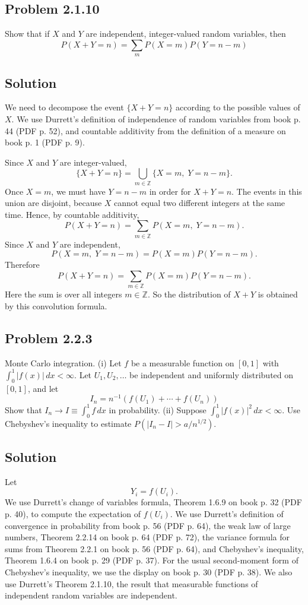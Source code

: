 \documentclass[a4paper,12pt,openany]{article}
\theoremstyle{plain}
\theoremstyle{definition}
\begin{document}
\subsection*{Problem 2.1.10}

Show that if $X$ and $Y$ are independent, integer-valued random variables, then
\[
P(X+Y=n) = \sum_m P(X=m)P(Y=n-m)
\]

\subsection*{Solution}

We need to decompose the event $\{X+Y=n\}$ according to the possible values of $X$. We use Durrett's definition of independence of random variables from book p. 44 (PDF p. 52), and countable additivity from the definition of a measure on book p. 1 (PDF p. 9).

\medskip

Since $X$ and $Y$ are integer-valued,
\[
\{X+Y=n\}
=
\bigcup_{m\in\mathbb{Z}}\{X=m,\;Y=n-m\}.
\]
Once $X=m$, we must have $Y=n-m$ in order for $X+Y=n$. The events in this union are disjoint, because $X$ cannot equal two different integers at the same time. Hence, by countable additivity,
\[
P(X+Y=n)
=
\sum_{m\in\mathbb{Z}}P(X=m,\;Y=n-m).
\]
Since $X$ and $Y$ are independent,
\[
P(X=m,\;Y=n-m)
=
P(X=m)P(Y=n-m).
\]
Therefore
\[
P(X+Y=n)
=
\sum_{m\in\mathbb{Z}}P(X=m)P(Y=n-m).
\]
Here the sum is over all integers $m\in\mathbb{Z}$.
So the distribution of $X+Y$ is obtained by this convolution formula.

\subsection*{Problem 2.2.3}

Monte Carlo integration. (i) Let $f$ be a measurable function on $[0, 1]$ with $\int_0^1 |f(x)|\,dx < \infty$. Let $U_1, U_2, \ldots$ be independent and uniformly distributed on $[0, 1]$, and let
\[
I_n = n^{-1}(f(U_1)+\cdots+f(U_n))
\]
Show that $I_n \to I \equiv \int_0^1 f\,dx$ in probability. (ii) Suppose $\int_0^1 |f(x)|^2\,dx < \infty$. Use Chebyshev’s inequality to estimate $P(|I_n - I| > a/n^{1/2})$.

\subsection*{Solution}

Let
\[
Y_i=f(U_i).
\]
We use Durrett's change of variables formula, Theorem 1.6.9 on book p. 32 (PDF p. 40), to compute the expectation of $f(U_i)$. We use Durrett's definition of convergence in probability from book p. 56 (PDF p. 64), the weak law of large numbers, Theorem 2.2.14 on book p. 64 (PDF p. 72), the variance formula for sums from Theorem 2.2.1 on book p. 56 (PDF p. 64), and Chebyshev's inequality, Theorem 1.6.4 on book p. 29 (PDF p. 37). For the usual second-moment form of Chebyshev's inequality, we use the display on book p. 30 (PDF p. 38). We also use Durrett's Theorem 2.1.10, the result that measurable functions of independent random variables are independent.
\end{document}
